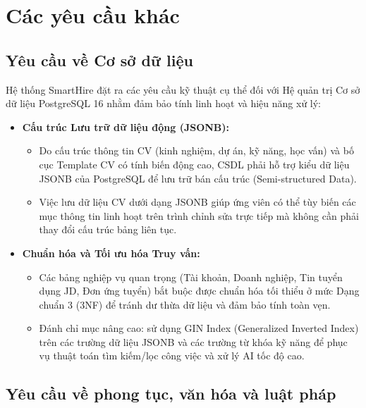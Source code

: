 
\clearpage

\section{Các yêu cầu khác}

\subsection{Yêu cầu về Cơ sở dữ liệu}

Hệ thống SmartHire đặt ra các yêu cầu kỹ thuật cụ thể đối với Hệ quản trị Cơ sở dữ liệu PostgreSQL 16 nhằm đảm bảo tính linh hoạt và hiệu năng xử lý:

\begin{itemize}
    \item \textbf{Cấu trúc Lưu trữ dữ liệu động (JSONB):}
    \begin{itemize}
        \item Do cấu trúc thông tin CV (kinh nghiệm, dự án, kỹ năng, học vấn) và bố cục Template CV có tính biến động cao, CSDL phải hỗ trợ kiểu dữ liệu JSONB của PostgreSQL để lưu trữ bán cấu trúc (Semi-structured Data).
        \item Việc lưu dữ liệu CV dưới dạng JSONB giúp ứng viên có thể tùy biến các mục thông tin linh hoạt trên trình chỉnh sửa trực tiếp mà không cần phải thay đổi cấu trúc bảng liên tục.
    \end{itemize}

    \item \textbf{Chuẩn hóa và Tối ưu hóa Truy vấn:}
    \begin{itemize}
        \item Các bảng nghiệp vụ quan trọng (Tài khoản, Doanh nghiệp, Tin tuyển dụng JD, Đơn ứng tuyển) bắt buộc được chuẩn hóa tối thiểu ở mức Dạng chuẩn 3 (3NF) để tránh dư thừa dữ liệu và đảm bảo tính toàn vẹn.
        \item Đánh chỉ mục nâng cao: sử dụng GIN Index (Generalized Inverted Index) trên các trường dữ liệu JSONB và các trường từ khóa kỹ năng để phục vụ thuật toán tìm kiếm/lọc công việc và xử lý AI tốc độ cao.
    \end{itemize}
\end{itemize}

\subsection{Yêu cầu về phong tục, văn hóa và luật pháp}

